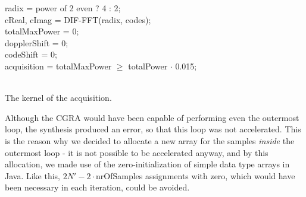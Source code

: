 \begin{algorithm}
    radix = power of 2 even ? 4 : 2;\\
    cReal, cImag = DIF-FFT(radix, codes);\\
    totalMaxPower = 0;\\
    dopplerShift = 0;\\
    codeShift = 0;\\
    acquisition = totalMaxPower $\geq$ totalPower $\cdot$  0.015;\\
    \\

    \label{alg:kernel}
    \caption{The kernel of the acquisition.}
\end{algorithm}

Although the CGRA would have been capable of performing even the outermost loop, the synthesis produced an error, so that this loop was not accelerated. This is the reason why we decided to allocate a new array for the samples \emph{inside} the outermost loop - it is not possible to be accelerated anyway, and by this allocation, we made use of the zero-initialization of simple data type arrays in Java. Like this, $2N'-2\cdot$nrOfSamples assignments with zero, which would have been necessary in each iteration, could be avoided.

